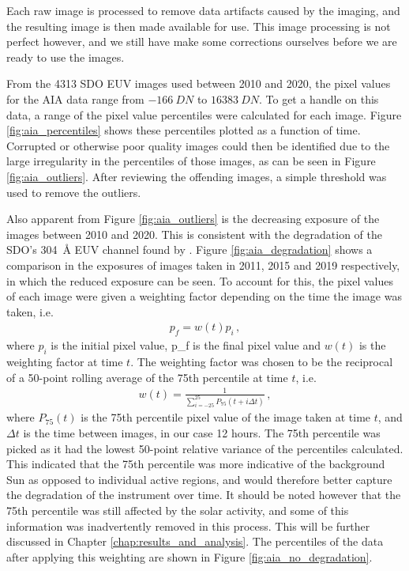 \documentclass[11pt,a4paper,onecolumn]{report}
\begin{document}
Each raw image is processed to remove data artifacts caused by the imaging,
and the resulting image is then made available for use. This image processing is
not perfect however, and we still have make some corrections ourselves before we
are ready to use the images.

From the 4313 SDO EUV images used between 2010 and 2020, the pixel values for
the AIA data range from \(\SI[]{-166}[]{DN}\) to \(\SI[]{16383}[]{DN}\). To get
a handle on this data, a range of the pixel value percentiles were calculated
for each image. Figure \ref{fig:aia_percentiles} shows these percentiles plotted
as a function of time. Corrupted or otherwise poor quality images could then be
identified due to the large irregularity in the percentiles of those images, as
can be seen in Figure \ref{fig:aia_outliers}. After reviewing the offending
images, a simple threshold was used to remove the outliers.

Also apparent from Figure \ref{fig:aia_outliers} is the decreasing exposure of
the images between 2010 and 2020. This is consistent with the degradation of the
SDO's \SI{304}{\angstrom} EUV channel found by \citet{boerner_photometric_2014}.
Figure \ref{fig:aia_degradation} shows a comparison in the exposures of images
taken in 2011, 2015 and 2019 respectively, in which the reduced exposure can be
seen. To account for this, the pixel values of each image were given a weighting
factor depending on the time the image was taken, i.e.
\begin{align}
  p_f = w(t) p_i \, ,
\end{align}
where $p_i$ is the initial pixel value, p_f is the final pixel value and $w(t)$
is the weighting factor at time $t$. The weighting factor was chosen to be the 
reciprocal of a 50-point rolling average of the 75th
percentile at time $t$, i.e.
\begin{align}
  w(t) = \frac{1}{\sum\limits_{i=-25}^{25}P_{75}(t + i \Delta t)} \, ,
\end{align}
where $P_{75}(t)$ is the 75th percentile pixel value of the image taken at time
$t$, and $\Delta t$ is the time between images, in our case 12 hours. The 75th
percentile was picked as it had the lowest 50-point relative variance of the
percentiles calculated. This indicated that the 75th percentile was more
indicative of the background Sun as opposed to individual active regions, and
would therefore better capture the degradation of the instrument over time. It
should be noted however that the 75th percentile was still affected by the solar
activity, and some of this information was inadvertently removed in this
process. This will be further discussed in Chapter
\ref{chap:results_and_analysis}. The percentiles of the data after applying this
weighting are shown in Figure \ref{fig:aia_no_degradation}. \\
\end{document}
